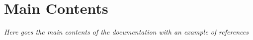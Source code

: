 %
%
%
%


\section{Main Contents}
\textit{Here goes the main contents of the documentation with an example of references \cite{github}}

